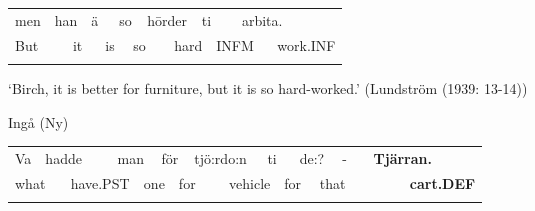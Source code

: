 \begin{tabular}{llllllllllllll}
\lsptoprule
men & \multicolumn{2}{l}{han

} & \multicolumn{2}{l}{ä

} & \multicolumn{2}{l}{so

} & \multicolumn{2}{l}{h\=order

} & \multicolumn{2}{l}{ti

} & \multicolumn{2}{l}{arbita.

} & \\
\multicolumn{2}{l}{But

} & \multicolumn{2}{l}{it

} & \multicolumn{2}{l}{is

} & \multicolumn{2}{l}{so

} & \multicolumn{2}{l}{hard

} & \multicolumn{2}{l}{INFM 

} & \multicolumn{2}{l}{work.INF

}\\
\lspbottomrule
\end{tabular}

\begin{styleTranslation}
‘Birch, it is better for furniture, but it is so hard-worked.’ (Lundström (1939: 13-14))

\end{styleTranslation}

\begin{listWWNumileveli}
\item 

\begin{styleExample}
Ingå (Ny)

\end{styleExample}

\end{listWWNumileveli}

\begin{tabular}{llllllllllllllllll}
\lsptoprule
Va & \multicolumn{2}{l}{hadde

} & \multicolumn{2}{l}{man

} & \multicolumn{2}{l}{för

} & \multicolumn{2}{l}{tjö:rdo:n

} & \multicolumn{2}{l}{ti

} & \multicolumn{2}{l}{de:?

} & \multicolumn{2}{l}{{}-

} & \multicolumn{2}{l}{{\bfseries Tjärran.}

} & \\
\multicolumn{2}{l}{what

} & \multicolumn{2}{l}{have.PST

} & \multicolumn{2}{l}{one

} & \multicolumn{2}{l}{for

} & \multicolumn{2}{l}{vehicle

} & \multicolumn{2}{l}{for

} & \multicolumn{2}{l}{that

} & \multicolumn{2}{l}{} & \multicolumn{2}{l}{{\bfseries cart.DEF}

}\\
\lspbottomrule
\end{tabular}

